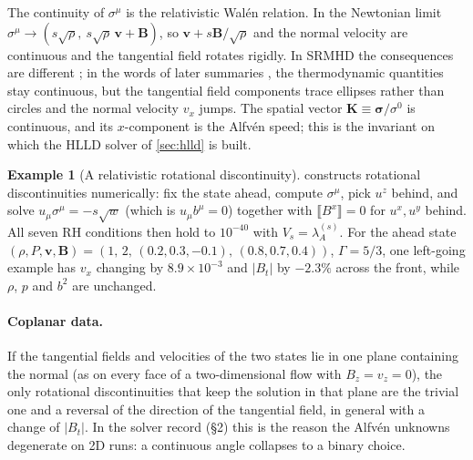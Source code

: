 \documentclass[11pt,a4paper,oneside,openany]{book}
\newcommand{\parencite}{\citep}
\theoremstyle{definition}
\newtheorem{example}{Example}[chapter]
\theoremstyle{plain}
\theoremstyle{remark}
\newcommand{\jump}[1]{\llbracket #1\rrbracket}
\newcommand{\vv}{\bm{v}}
\newcommand{\BB}{\bm{B}}
\newcommand{\Ptot}{P}
\begin{document}
The continuity of $\sigma^\mu$ is the relativistic Walén relation. In the Newtonian
limit $\sigma^\mu\to(s\sqrt\rho,\ s\sqrt\rho\,\vv+\BB)$, so $\vv+s\BB/\sqrt\rho$ and the
normal velocity are continuous and the tangential field rotates rigidly. In SRMHD the
consequences are different \parencite{Komissarov1997}; in the words of later summaries
\parencite{MignoneBodo2006,MignoneUglianoBodo2009}, the thermodynamic quantities stay
continuous, but the tangential field components trace ellipses rather than circles and
the normal velocity $v_x$ jumps. The spatial vector
$\bm K\equiv\bm\sigma/\sigma^0$ is continuous, and its $x$-component is the Alfvén speed;
this is the invariant on which the HLLD solver of \cref{sec:hlld} is built.

\begin{example}[A relativistic rotational discontinuity]
 constructs rotational discontinuities numerically: fix the state
ahead, compute $\sigma^\mu$, pick $u^z$ behind, and solve $u_\mu\sigma^\mu=-s\sqrt w$
(which is $u_\mu b^\mu=0$) together with $\jump{B^x}=0$ for $u^x,u^y$ behind. All seven RH
conditions then hold to $10^{-40}$ with $V_s=\lambda_A^{(s)}$. For the ahead state
$(\rho,\Ptot,\vv,\BB)=(1,\,2,\,(0.2,0.3,-0.1),\,(0.8,0.7,0.4))$, $\Gamma=5/3$, one
left-going example has $v_x$ changing by $8.9\times10^{-3}$ and $|B_t|$ by $-2.3\%$ across
the front, while $\rho$, $p$ and $b^2$ are unchanged.
\end{example}

\paragraph{Coplanar data.} If the tangential fields and velocities of the two states lie in
one plane containing the normal (as on every face of a two-dimensional flow with
$B_z=v_z=0$), the only rotational discontinuities that keep the solution in that plane are
the trivial one and a reversal of the direction of the tangential field, in general with a
change of $|B_t|$. In the solver record (\S2) this is the reason the
Alfvén unknowns degenerate on 2D runs: a continuous angle collapses to a binary choice.
\end{document}
